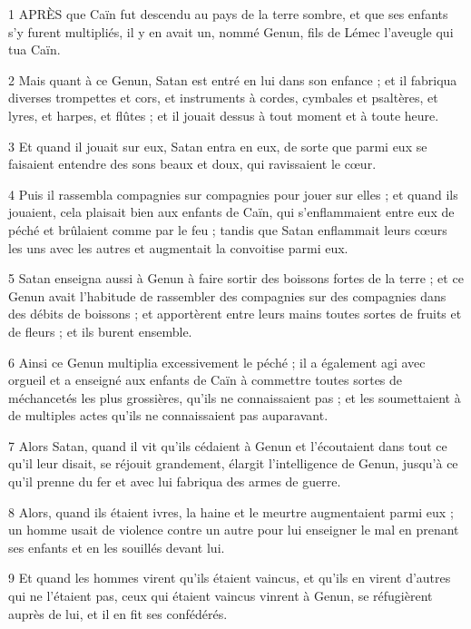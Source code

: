\par 1 APRÈS que Caïn fut descendu au pays de la terre sombre, et que ses enfants s'y furent multipliés, il y en avait un, nommé Genun, fils de Lémec l'aveugle qui tua Caïn.

\par 2 Mais quant à ce Genun, Satan est entré en lui dans son enfance ; et il fabriqua diverses trompettes et cors, et instruments à cordes, cymbales et psaltères, et lyres, et harpes, et flûtes ; et il jouait dessus à tout moment et à toute heure.

\par 3 Et quand il jouait sur eux, Satan entra en eux, de sorte que parmi eux se faisaient entendre des sons beaux et doux, qui ravissaient le cœur.

\par 4 Puis il rassembla compagnies sur compagnies pour jouer sur elles ; et quand ils jouaient, cela plaisait bien aux enfants de Caïn, qui s'enflammaient entre eux de péché et brûlaient comme par le feu ; tandis que Satan enflammait leurs cœurs les uns avec les autres et augmentait la convoitise parmi eux.

\par 5 Satan enseigna aussi à Genun à faire sortir des boissons fortes de la terre ; et ce Genun avait l'habitude de rassembler des compagnies sur des compagnies dans des débits de boissons ; et apportèrent entre leurs mains toutes sortes de fruits et de fleurs ; et ils burent ensemble.

\par 6 Ainsi ce Genun multiplia excessivement le péché ; il a également agi avec orgueil et a enseigné aux enfants de Caïn à commettre toutes sortes de méchancetés les plus grossières, qu'ils ne connaissaient pas ; et les soumettaient à de multiples actes qu'ils ne connaissaient pas auparavant.

\par 7 Alors Satan, quand il vit qu'ils cédaient à Genun et l'écoutaient dans tout ce qu'il leur disait, se réjouit grandement, élargit l'intelligence de Genun, jusqu'à ce qu'il prenne du fer et avec lui fabriqua des armes de guerre.

\par 8 Alors, quand ils étaient ivres, la haine et le meurtre augmentaient parmi eux ; un homme usait de violence contre un autre pour lui enseigner le mal en prenant ses enfants et en les souillés devant lui.

\par 9 Et quand les hommes virent qu'ils étaient vaincus, et qu'ils en virent d'autres qui ne l'étaient pas, ceux qui étaient vaincus vinrent à Genun, se réfugièrent auprès de lui, et il en fit ses confédérés.

